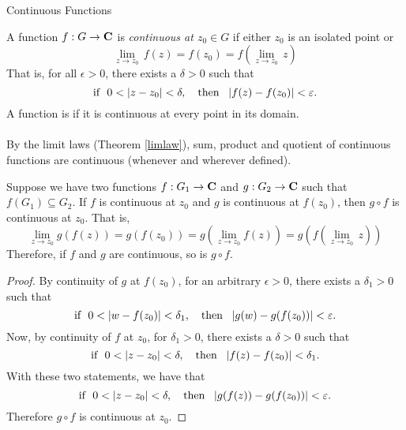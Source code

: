 \vspace*{1em}

\begin{mdframed}
\begin{center}
{\Large Continuous Functions}
\end{center}
\end{mdframed}

\begin{definition}
A function $f: G \to \mathbf C$ is \emph{continuous at $z_0 \in G$} if either $z_0$ is an isolated point or 
\[\lim_{z \to z_0}\,f(z) = f(z_0) = f\left(\lim_{z\to z_0}\,z\right)\]
That is, for all $\epsilon > 0$, there exists a $\delta > 0$ such that
\[\text{if }\ 0 < \left\lvert z - z_0\right\rvert < \delta,\quad \text{then }\ \left\lvert f(z) - f(z_0)\right\rvert<\varepsilon.\]
A function is  if it is continuous at every point in its domain.\\
\\
By the limit laws (Theorem \ref{limlaw}), sum, product and quotient of continuous functions are continuous (whenever and wherever defined).
\end{definition}

\vspace*{1em}

\begin{theorem}\label{composcont}
Suppose we have two functions $f:G_1 \to \mathbf C$ and $g: G_2 \to \mathbf C$ such that $f(G_1) \subseteq G_2$. If $f$ is continuous at $z_0$ and $g$ is continuous at $f(z_0)$, then $g\circ f$ is continuous at $z_0$. That is,
\[\lim_{z \to z_0}g(f(z)) = g(f(z_0)) = g\left(\lim_{z\to z_0}f(z)\right) = g\left(f\left(\lim_{z\to z_0}\,z\right)\right)\]
Therefore, if $f$ and $g$ are continuous, so is $g\circ f$.
\end{theorem}
\begin{proof}
By continuity of $g$ at $f(z_0)$, for an arbitrary $\epsilon > 0$, there exists a $\delta_1 > 0$ such that
\[\text{if }\ 0 < \left\lvert w - f(z_0)\right\rvert < \delta_1,\quad \text{then }\ \left\lvert g(w) - g(f(z_0))\right\rvert<\varepsilon.\]
Now, by continuity of $f$ at $z_0$, for $\delta_1 > 0$, there exists a $\delta > 0$ such that
\[\text{if }\ 0 < \left\lvert z - z_0\right\rvert < \delta,\quad \text{then }\ \left\lvert f(z) - f(z_0)\right\rvert<\delta_1.\]
With these two statements, we have that 
\[\text{if }\ 0 < \left\lvert z - z_0\right\rvert < \delta,\quad \text{then }\ \left\lvert g(f(z)) - g(f(z_0))\right\rvert<\varepsilon.\]
Therefore $g\circ f$ is continuous at $z_0$.
\end{proof}

\vspace*{1em}

